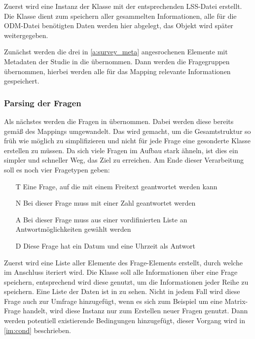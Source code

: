 Zuerst wird eine Instanz der Klasse  mit der entsprechenden LSS-Datei erstellt.
Die Klasse  dient zum speichern aller gesammelten Informationen, alle für die ODM-Datei benötigten Daten werden hier abgelegt, das Objekt wird später weitergegeben.

Zunächst werden die drei in \cref{a:survey_meta} angesrochenen Elemente mit Metadaten der Studie in die  übernommen.
Dann werden die Fragegruppen übernommen, hierbei werden alle für das Mapping relevante Informationen gespeichert.

\subsubsection{Parsing der Fragen}
\label{im:q}

Als nächstes werden die Fragen in  übernommen. Dabei werden diese bereits gemäß des Mappings umgewandelt.
Das wird gemacht, um die Gesamtstruktur so früh wie möglich zu simplifizieren und nicht für jede Frage eine gesonderte Klasse erstellen zu müssen.
Da sich viele Fragen im Aufbau stark ähneln, ist dies ein simpler und schneller Weg, das Ziel zu erreichen.
Am Ende dieser Verarbeitung soll es noch vier Fragetypen geben:

\begin{enumerate}
\item[T] Eine Frage, auf die mit einem Freitext geantwortet werden kann
\item[N] Bei dieser Frage muss mit einer Zahl geantwortet werden
\item[A] Bei dieser Frage muss aus einer vordifinierten Liste an Antwortmöglichkeiten gewählt werden
\item[D] Diese Frage hat ein Datum und eine Uhrzeit als Antwort
\end{enumerate}

Zuerst wird eine Liste aller  Elemente des Frage-Elements erstellt, durch welche im Anschluss iteriert wird.
Die Klasse  soll alle Informationen über eine Frage speichern, entsprechend wird diese genutzt, um die Informationen jeder Reihe zu speichern.
Eine Liste der Daten ist in %
zu sehen.
Nicht in jedem Fall wird diese Frage auch zur Umfrage hinzugefügt, wenn es sich zum Beispiel um eine Matrix-Frage handelt, wird diese Instanz nur zum Erstellen neuer Fragen genutzt.
Dann werden potentiell existierende Bedingungen hinzugefügt, dieser Vorgang wird in \cref{im:cond} beschrieben.

